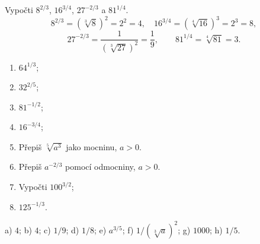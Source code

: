 \documentclass[11pt,a4paper]{article}
\begin{document}
\begin{prikladReseniBox}[title={Příklad 1}]
Vypočti $8^{2/3}$, $16^{3/4}$, $27^{-2/3}$ a $81^{1/4}$.
\tcblower
\[
8^{2/3}=(\sqrt[3]8)^2=2^2=4,\quad
16^{3/4}=(\sqrt[4]{16})^3=2^3=8,
\]
\[
27^{-2/3}=\frac1{(\sqrt[3]{27})^2}=\frac19,\qquad
81^{1/4}=\sqrt[4]{81}=3.
\]
\end{prikladReseniBox}
\begin{zadaniReseniBox}[title={Samostatná práce 1}]
\begin{enumerate}[label=\alph*)]
\item $64^{1/3}$; \item $32^{2/5}$; \item $81^{-1/2}$;
\item $16^{-3/4}$;
\item Přepiš $\sqrt[5]{a^3}$ jako mocninu, $a>0$.
\item Přepiš $a^{-2/3}$ pomocí odmocniny, $a>0$.
\item Vypočti $100^{3/2}$; \item $125^{-1/3}$.
\end{enumerate}
\tcblower
 a) $4$; b) $4$; c) $1/9$; d) $1/8$;
 e) $a^{3/5}$; f) $1/(\sqrt[3]a)^2$;
 g) $1000$; h) $1/5$.
\end{zadaniReseniBox}
\end{document}
